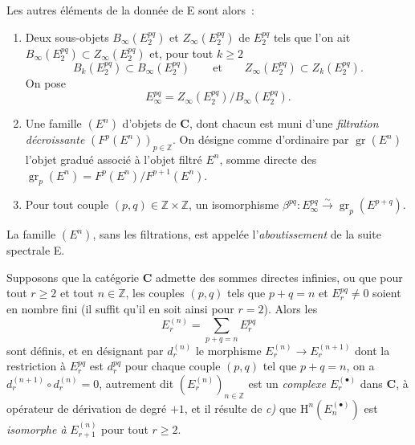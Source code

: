 \begin{env}[11.1.1]
Les autres éléments de la donnée de E sont alors~:
\begin{enumerate}
  \item[$d)$] Deux sous-objets $B_\infty(E_2^{pq})$ et
    $Z_\infty(E_2^{pq})$ de $E_2^{pq}$ tels que l'on ait
    $B_\infty(E_2^{pq})\subset Z_\infty(E_2^{pq})$ et, pour tout $k\geq2$
    \[
      B_k(E_2^{pq})\subset B_\infty(E_2^{pq})
      \qquad\text{et}\qquad
      Z_\infty(E_2^{pq})\subset Z_k(E_2^{pq}).
    \]
    On pose
    \[
    \label{0.11.1.1.3-fr}
      E_\infty^{pq}=Z_\infty(E_2^{pq})/B_\infty(E_2^{pq}).
      \tag{11.1.1.3}
    \]
  \item[$e)$]
    Une famille $(E^n)$ d'objets de $\boldsymbol{C}$, dont chacun est muni d'une
    \emph{filtration décroissante} $(F^p(E^n))_{p\in\mathbb Z}$. On désigne
    comme d'ordinaire par $\operatorname{gr}(E^n)$ l'objet gradué associé à
    l'objet filtré $E^n$, somme directe des
    $\operatorname{gr}_p(E^n)=F^p(E^n)/F^{p+1}(E^n)$.
  \item[$f)$] Pour tout couple $(p,q)\in\mathbb Z\times\mathbb Z$, un
    isomorphisme
    $\beta^{pq}:E_\infty^{pq}\xrightarrow{\sim}
    \operatorname{gr}_p(E^{p+q})$.
\end{enumerate}

La famille $(E^n)$, sans les filtrations, est appelée l'\emph{aboutissement}
de la suite spectrale E.

Supposons que la catégorie $\boldsymbol{C}$ admette des sommes directes infinies,
ou que pour tout $r\geq2$ et tout $n\in\mathbb Z$, les couples $(p,q)$ tels
que $p+q=n$ et $E_r^{pq}\ne0$ soient en nombre fini (il suffit qu'il en soit
ainsi pour $r=2$). Alors les
\[
  E_r^{(n)}=\sum_{p+q=n}E_r^{pq}
\]
sont définis, et en désignant par $d_r^{(n)}$ le morphisme
$E_r^{(n)}\to E_r^{(n+1)}$ dont la restriction à $E_r^{pq}$ est $d_r^{pq}$
pour chaque couple $(p,q)$ tel que $p+q=n$, on a
$d_r^{(n+1)}\circ d_r^{(n)}=0$, autrement dit $(E_r^{(n)})_{n\in\mathbb Z}$
est un \emph{complexe $E_r^{(\bullet)}$} dans $\boldsymbol{C}$, à opérateur de
dérivation de degré $+1$, et il résulte de \emph{c)} que
$\mathrm H^n(E_n^{(\bullet)})$ est \emph{isomorphe à} $E_{r+1}^{(n)}$ pour tout
$r\geq2$.
\end{env}

